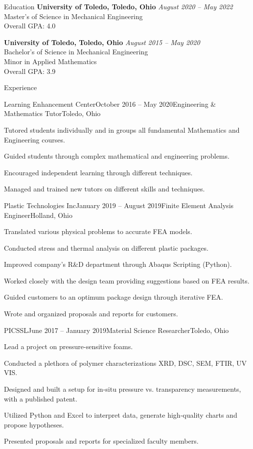 \documentclass{bilal}
\begin{document}

\begin{rSection}{Education}
{\bf University of Toledo, Toledo, Ohio} \hfill {\em August 2020 -- May 2022} \\ 
Master's of Science in Mechanical Engineering \\
Overall GPA: 4.0

{\bf University of Toledo, Toledo, Ohio} \hfill {\em August 2015 -- May 2020} \\ 
Bachelor's of Science in Mechanical Engineering \\
Minor in Applied Mathematics \smallskip \\
Overall GPA: 3.9
\end{rSection}
\begin{rSection}{Experience}
\begin{rSubsection}{Learning Enhancement Center}{October 2016 -- May 2020}{Engineering \& Mathematics Tutor}{Toledo, Ohio}
\item Tutored students individually and in groups all fundamental Mathematics and Engineering courses.
\item Guided students through complex mathematical and engineering problems.
\item Encouraged independent learning through different techniques.
\item Managed and trained new tutors on different skills and techniques.
\end{rSubsection}
\begin{rSubsection}{Plastic Technologies Inc}{January 2019 -- August 2019}{Finite Element Analysis Engineer}{Holland, Ohio}
\item Translated various physical problems to accurate FEA models.
\item Conducted stress and thermal analysis on different plastic packages.
\item Improved company's R\&D department through Abaqus Scripting (Python).
\item Worked closely with the design team providing suggestions based on FEA results.
\item Guided customers to an optimum package design through iterative FEA.
\item Wrote and organized proposals and reports for customers.
\end{rSubsection}
\begin{rSubsection}{PICSSL}{June 2017 -- January 2019}{Material Science Researcher}{Toledo, Ohio}
\item Lead a project on pressure-sensitive foams.
\item Conducted a plethora of polymer characterizations XRD, DSC, SEM, FTIR, UV VIS.
\item Designed and built a setup for in-situ pressure vs. transparency measurements, with a published patent.
\item Utilized Python and Excel to interpret data, generate high-quality charts and propose hypotheses.
\item Presented proposals and reports for specialized faculty members.
\end{rSubsection}
\end{rSection}
\end{document}
